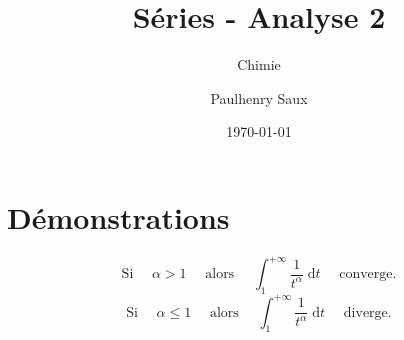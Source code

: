 \documentclass[french]{yLectureNote}
\title{Séries - Analyse 2}
\subtitle{Chimie}
\author{Paulhenry Saux}
\date{\today}
\newcommand{\N}[0]{\mathbb{N}}
\newcommand{\dd}[0]{\mathrm{d}}
\begin{document}
\setcounter{chapter}{1}
\chapter{Démonstrations }
%
%
\begin{theorem}
 $$\text{Si } \quad \alpha > 1\quad \text{ alors }\quad
\int_1^{+\infty} \frac{1}{t^{\alpha}}\;\dd t \quad\text{ converge.}$$
$$\text{Si } \quad \alpha\le 1\quad \text{ alors }\quad
\int_1^{+\infty} \frac{1}{t^{\alpha}}\;\dd t \quad\text{ diverge.}$$
\end{theorem}
\end{document}
